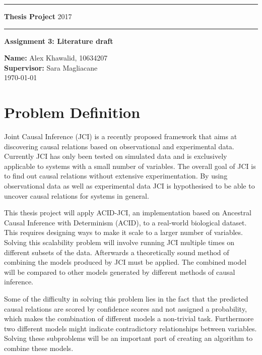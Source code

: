 \documentclass[11pt]{article}
\begin{document}
\rule{\textwidth}{1pt}

\textbf{Thesis Project} \hfill 2017
\rule{\textwidth}{1pt}
\vspace*{20pt}


\textbf{Assignment 3: Literature draft}

\textbf{Name:} Alex Khawalid, 10634207\\
\textbf{Supervisor:} Sara Magliacane\\
\today

\section{Problem Definition}
Joint Causal Inference (JCI) is a recently proposed framework that aims at discovering causal relations based on observational and experimental data. Currently JCI has only been tested on simulated data and is exclusively applicable to systems with a small number of variables. The overall goal of JCI is to find out causal relations without extensive experimentation.  
By using observational data as well as experimental data JCI is hypothesised to be able to uncover causal relations for systems in general. 

This thesis project will apply ACID-JCI, an implementation based on Ancestral Causal Inference with Determinism (ACID), to a real-world biological dataset. This requires designing ways to make it scale to a larger number of variables. Solving this scalability problem will involve running JCI multiple times on different subsets of the data. Afterwards a theoretically sound method of combining the models produced by JCI must be applied. The combined model will be compared to other models generated by different methods of causal inference. 

Some of the difficulty in solving this problem lies in the fact that the predicted causal relations are scored by confidence scores and not assigned a probability, which makes the combination of different models a non-trivial task. Furthermore two different models might indicate contradictory relationships between variables. Solving these subproblems will be an important part of creating an algorithm to combine these models.
\end{document}

